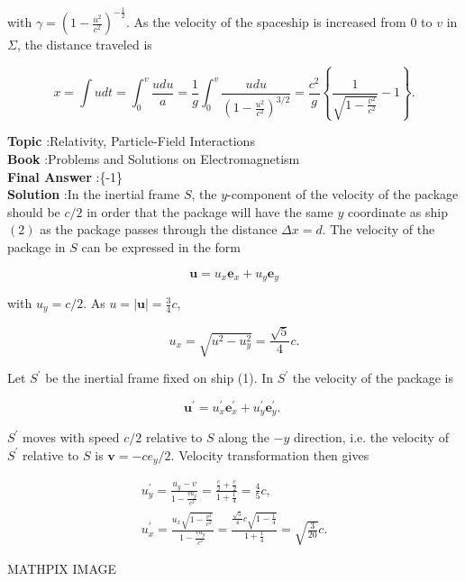 \documentclass[10pt]{article}
\begin{document}
with $\gamma=\left(1-\frac{u^{2}}{c^{2}}\right)^{-\frac{1}{2}}$. As the velocity of the spaceship is increased from 0 to $v$ in $\Sigma$, the distance traveled is

$$
x=\int u d t=\int_{0}^{v} \frac{u d u}{a}=\frac{1}{g} \int_{0}^{v} \frac{u d u}{\left(1-\frac{u^{2}}{c^{2}}\right)^{3 / 2}}=\frac{c^{2}}{g}\left\{\frac{1}{\sqrt{1-\frac{v^{2}}{c^{2}}}}-1\right\} .
$$



\textbf{Topic} :Relativity, Particle-Field Interactions\\
\textbf{Book} :Problems and Solutions on Electromagnetism\\
\textbf{Final Answer} :\left\{-1\right\}\\


\textbf{Solution} :In the inertial frame $S$, the $y$-component of the velocity of the package should be $c / 2$ in order that the package will have the same $y$ coordinate as ship $(2)$ as the package passes through the distance $\Delta x=d$. The velocity of the package in $S$ can be expressed in the form

$$
\mathbf{u}=u_{x} \mathbf{e}_{x}+u_{y} \mathbf{e}_{y}
$$

with $u_{y}=c / 2$. As $u=|\mathbf{u}|=\frac{3}{4} c$,

$$
u_{x}=\sqrt{u^{2}-u_{y}^{2}}=\frac{\sqrt{5}}{4} c .
$$

Let $S^{\prime}$ be the inertial frame fixed on ship (1). In $S^{\prime}$ the velocity of the package is

$$
\mathbf{u}^{\prime}=u_{x}^{\prime} \mathbf{e}_{x}^{\prime}+u_{y}^{\prime} \mathbf{e}_{y}^{\prime} \text {. }
$$

$S^{\prime}$ moves with speed $c / 2$ relative to $S$ along the $-y$ direction, i.e. the velocity of $S^{\prime}$ relative to $S$ is $\mathbf{v}=-c e_{y} / 2$. Velocity transformation then gives

$$
\begin{gathered}
u_{y}^{\prime}=\frac{u_{y}-v}{1-\frac{v u_{y}}{c^{2}}}=\frac{\frac{c}{2}+\frac{c}{2}}{1+\frac{1}{4}}=\frac{4}{5} c, \\
u_{x}^{\prime}=\frac{u_{x} \sqrt{1-\frac{v^{2}}{c^{2}}}}{1-\frac{v u_{y}}{c^{2}}}=\frac{\frac{\sqrt{5}}{4} c \sqrt{1-\frac{1}{4}}}{1+\frac{1}{4}}=\sqrt{\frac{3}{20}} c .
\end{gathered}
$$



MATHPIX IMAGE
\end{document}

